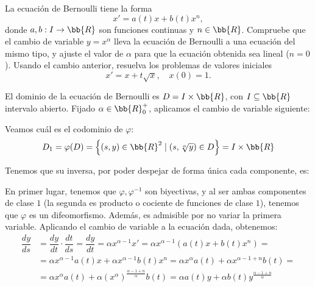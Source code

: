 \begin{ejercicio}
    La ecuación de Bernoulli tiene la forma
    \begin{equation*}
        x' = a(t)x + b(t)x^n,
    \end{equation*}
    donde $a, b : I \to \bb{R}$ son funciones continuas y $n \in \bb{R}$. Compruebe que el cambio de variable $y = x^\alpha$ lleva la ecuación de Bernoulli a una ecuación del mismo tipo, y ajuste el valor de $\alpha$ para que la ecuación obtenida sea lineal ($n = 0$). Usando el cambio anterior, resuelva los problemas de valores iniciales
    \begin{equation*}
        x' = x + t\sqrt{x}, \quad x(0) = 1.
    \end{equation*}

    El dominio de la ecuación de Bernoulli es $D=I\times \bb{R}$, con $I\subseteq \bb{R}$ intervalo abierto.
    Fijado $\alpha\in \bb{R}^+_0$, aplicamos el cambio de variable siguiente:

    Veamos cuál es el codominio de $\varphi$:
    \begin{equation*}
        D_1=\varphi(D) = \left\{(s,y)\in \bb{R}^2 \mid (s, \sqrt[\alpha]{y})\in D\right\} = I\times \bb{R}
    \end{equation*}

    Tenemos que su inversa, por poder despejar de forma única cada componente, es:

    En primer lugar, tenemos que $\varphi,\varphi^{-1}$ son biyectivas, y al ser ambas componentes de clase $1$ (la segunda es producto o cociente de funciones de clase $1$), tenemos que $\varphi$ es un difeomorfismo. Además, es admisible por no variar la primera variable.
    Aplicando el cambio de variable a la ecuación dada, obtenemos:
    \begin{align*}
        \dfrac{dy}{ds} &= \dfrac{dy}{dt}\cdot \dfrac{dt}{ds} = \dfrac{dy}{dt} = \alpha x^{\alpha-1}x' = \alpha x^{\alpha-1}\left(a(t)x + b(t)x^n\right)
        =\\&= \alpha x^{\alpha-1}a(t)x + \alpha x^{\alpha-1}b(t)x^n
        = \alpha x^\alpha a(t) + \alpha x^{\alpha-1+n}b(t)
        =\\&= \alpha x^\alpha a(t) + \alpha (x^\alpha)^{\frac{\alpha-1+n}{\alpha}}b(t)
        = \alpha a(t) y+ \alpha b(t)y^{\frac{\alpha-1+n}{\alpha}}
    \end{align*}


\end{ejercicio}
